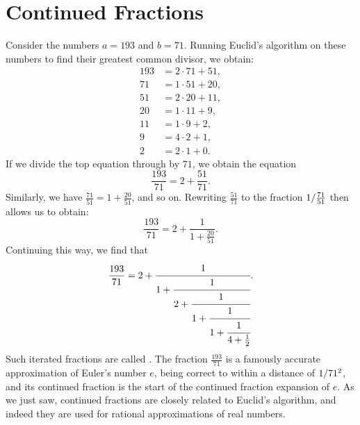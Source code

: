 \section{Continued Fractions}

Consider the numbers $a=193$ and $b=71$. Running Euclid's algorithm on these numbers to find their greatest common divisor, we obtain:
\begin{align*}
  193 & = 2\cdot 71 + 51, \\
  71 & = 1\cdot 51 + 20, \\
  51 & = 2\cdot 20 + 11, \\
  20 & = 1\cdot 11 + 9, \\
  11 & = 1\cdot 9 + 2, \\
  9 & = 4\cdot 2 + 1, \\
  2 & = 2\cdot 1 + 0.
\end{align*}
If we divide the top equation through by $71$, we obtain the equation
\begin{equation*}
  \frac{193}{71}=2+\frac{51}{71}.
\end{equation*}
Similarly, we have $\frac{71}{51}=1+\frac{20}{51}$, and so on. Rewriting $\frac{51}{71}$ to the fraction $1/\frac{71}{51}$ then allows us to obtain:
\begin{equation*}
  \frac{193}{71}=2+\frac{1}{1+\frac{20}{51}}.
\end{equation*}
Continuing this way, we find that
\begin{equation*}
  \frac{193}{71}=2+\cfrac{1}{1+\cfrac{1}{2+\cfrac{1}{1+\cfrac{1}{1+\cfrac{1}{4+\tfrac{1}{2}}}}}}.
\end{equation*}
Such iterated fractions are called . The fraction $\frac{193}{71}$ is a famously accurate approximation of Euler's number $e$, being correct to within a distance of $1/71^2$, and its continued fraction is the start of the continued fraction expansion of $e$. As we just saw, continued fractions are closely related to Euclid's algorithm, and indeed they are used for rational approximations of real numbers.

